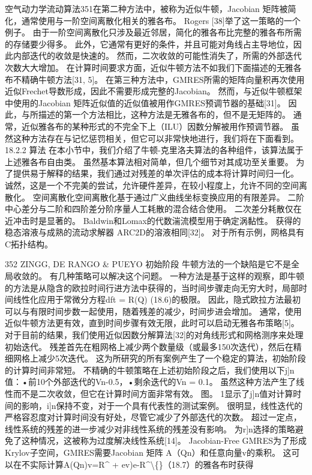 \documentclass[UTF8,11pt,a4paper,openany,fontset=fandol]{ctexbook}
\begin{document}
空气动力学流动算法351在第二种方法中，被称为近似牛顿，Jacobian 矩阵被简化，通常使用与一阶空间离散化相关的雅各布。 Rogers [38]举了这一策略的一个例子。 由于一阶空间离散化只涉及最近邻居，简化的雅各布比完整的雅各布所需的存储要少得多。 此外，它通常有更好的条件，并且可能对角线占主导地位，因此内部迭代的收敛是快速的。 然而，二次收敛的可能性消失了，所需的外部迭代次数大大增加。 在计算时间要求方面，近似牛顿方法不如我们下面描述的无雅各布不精确牛顿方法[31, 5]。 在第三种方法中，GMRES所需的矩阵向量积再次使用近似Frechet导数形成，因此不需要形成完整的Jacobian。 然而，与近似牛顿框架中使用的Jacobian 矩阵近似值的近似值被用作GMRES预调节器的基础[31]。 因此，与所描述的第一个方法相比，这种方法是无雅各布的，但不是无矩阵的。 通常，近似雅各布的某种形式的不完全下上（ILU）因数分解被用作预调节器。 虽然这种方法存在与记忆惩罚相关，但它可以非常快地进行，我们将在下面看到。 18.2.2 算法 在本小节中，我们介绍了牛顿-克里洛夫算法的各种组件，该算法属于上述雅各布自由类。 虽然基本算法相对简单，但几个细节对其成功至关重要。 为了提供易于解释的结果，我们通过对残差的单次评估的成本将计算时间归一化。 诚然，这是一个不完美的尝试，允许硬件差异，在较小程度上，允许不同的空间离散化。 空间离散化空间离散化基于通过广义曲线坐标变换应用的有限差异。 二阶中心差分与二阶和四阶差分阶序量人工耗散的混合结合使用。 二次差分耗散仅在近冲击时是显著的。 Baldwin和Lomax的代数湍流模型用于确定涡黏性。 获得的稳态溶液与成熟的流动求解器 ARC2D的溶液相同[32]。 对于所有示例，网格具有C拓扑结构。

352 ZINGG, DE RANGO \& PUEYO 初始阶段 牛顿方法的一个缺陷是它不是全局收敛的。 有几种策略可以解决这个问题。 一种方法是基于这样的观察，即牛顿的方法是从隐含的欧拉时间行进方法中获得的，当时间步骤走向无穷大时，局部时间线性化应用于常微分方程dft = R(Q) (18.6)的极限。 因此，隐式欧拉方法最初可以与有限时间步数一起使用，随着残差的减少，时间步进会增加。 通常，使用近似牛顿方法更有效，直到时间步骤有效无限，此时可以启动无雅各布策略[5]。 对于目前的结果，我们使用近似因数分解算法[32]的对角线形式和网格测序来处理初始迭代。 残差首先在粗网格上减少两个数量级（或最多150次迭代），然后在精细网格上减少5次迭代。 这为所研究的所有案例产生了一个稳定的算法，初始阶段的计算时间非常短。 不精确的牛顿策略在上述初始阶段之后，我们使用以下j]n值：•前10个外部迭代的Vn-0.5，•剩余迭代的Vn = 0.1。 虽然这种方法产生了线性而不是二次收敛，但它在计算时间方面非常有效。 图。 1显示了j]n值对计算时间的影响，i]n保持不变，对于一个具有代表性的测试案例。 很明显，线性迭代的严格容忍度对计算时间没有好处，尽管它减少了外部迭代的次数。 超过一定点，线性系统的残差的进一步减少对非线性系统的残差没有影响。 为r]n选择的策略避免了这种情况，这被称为过度解决线性系统[14]。 Jacobian-Free GMRES为了形成Krylov子空间，GMRES需要Jacobian 矩阵 A（Qn）和任意向量v的乘积。 这可以在不实际计算A(Qn)v=R\textasciicircum{} + ev)e-R\textasciicircum{}\textbackslash\{\}（18.7）的雅各布时获得
\end{document}
